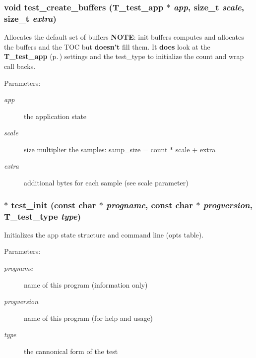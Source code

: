 \subsubsection{\setlength{\rightskip}{0pt plus 5cm}void test\_\-create\_\-buffers ({\bf T\_\-test\_\-app} $\ast$ {\em app}, size\_\-t {\em scale}, size\_\-t {\em extra})}\label{test__utils_8h_a33}


Allocates the default set of buffers {\bf NOTE}: init buffers computes and allocates the buffers and the TOC but {\bf doesn't} fill them. It {\bf does} look at the {\bf T\_\-test\_\-app} {\rm (p.\,\pageref{structT__test__app})} settings and the test\_\-type to initialize the count and wrap call backs.

\begin{Desc}
\item[Parameters: ]\par
\begin{description}
\item[{\em 
app}]the application state \item[{\em 
scale}]size multiplier the samples: samp\_\-size = count $\ast$ scale + extra \item[{\em 
extra}]additional bytes for each sample (see scale parameter) \end{description}
\end{Desc}
\subsubsection{$\ast$ test\_\-init (const char $\ast$ {\em progname}, const char $\ast$ {\em progversion}, {\bf T\_\-test\_\-type} {\em type})}\label{test__utils_8h_a32}


Initializes the app state structure and command line (opts table).

\begin{Desc}
\item[Parameters: ]\par
\begin{description}
\item[{\em 
progname}]name of this program (information only) \item[{\em 
progversion}]name of this program (for help and usage) \item[{\em 
type}]the cannonical form of the test \end{description}
\end{Desc}
